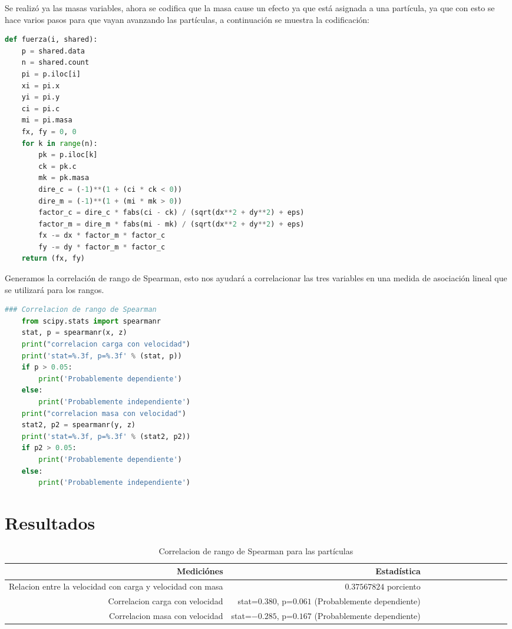 \documentclass{article}
\begin{document}
Se realizó ya las masas variables, ahora se codifica que la masa cause un efecto ya que está asignada a una partícula, ya que con esto se hace varios pasos para que vayan avanzando las partículas, a continuación se muestra la codificación:
\begin{lstlisting}[caption=masa, label=codigo2, language=Python]
def fuerza(i, shared):
    p = shared.data
    n = shared.count
    pi = p.iloc[i]
    xi = pi.x
    yi = pi.y
    ci = pi.c
    mi = pi.masa
    fx, fy = 0, 0
    for k in range(n):
        pk = p.iloc[k]
        ck = pk.c
        mk = pk.masa
        dire_c = (-1)**(1 + (ci * ck < 0))
        dire_m = (-1)**(1 + (mi * mk > 0))
        factor_c = dire_c * fabs(ci - ck) / (sqrt(dx**2 + dy**2) + eps)
        factor_m = dire_m * fabs(mi - mk) / (sqrt(dx**2 + dy**2) + eps)
        fx -= dx * factor_m * factor_c
        fy -= dy * factor_m * factor_c
    return (fx, fy)
\end{lstlisting}

Generamos la correlación de rango de Spearman, esto nos ayudará a correlacionar las tres variables en una medida de asociación lineal que se utilizará para los rangos.

\begin{lstlisting}[caption=Spearman, label=codigo2, language=Python]
### Correlacion de rango de Spearman
    from scipy.stats import spearmanr
    stat, p = spearmanr(x, z)
    print("correlacion carga con velocidad")
    print('stat=%.3f, p=%.3f' % (stat, p))
    if p > 0.05:
        print('Probablemente dependiente')
    else:
        print('Probablemente independiente')
    print("correlacion masa con velocidad")
    stat2, p2 = spearmanr(y, z)
    print('stat=%.3f, p=%.3f' % (stat2, p2))
    if p2 > 0.05:
        print('Probablemente dependiente')
    else:
        print('Probablemente independiente')
\end{lstlisting}

\section{Resultados}\label{res}
\begin{table}[h!]
    \centering
    \caption{Correlacion de rango de Spearman para las partículas}
    \begin{tabular}{|r|r|r|r||r|r|r|r||r|r|r|r|}
    \hline
       Mediciónes & Estadística \\
       \hline\hline
        Relacion entre la velocidad con carga y velocidad con masa & $0.37567824$ porciento \\
        \hline
       Correlacion carga con velocidad  & stat=$0.380$, p=$0.061$ (Probablemente dependiente) \\
        \hline
       Correlacion masa con velocidad  & stat=$-0.285$, p=$0.167$ (Probablemente dependiente) \\
        \hline
    \end{tabular}
    \label{medir_R}
\end{table}
\end{document}
